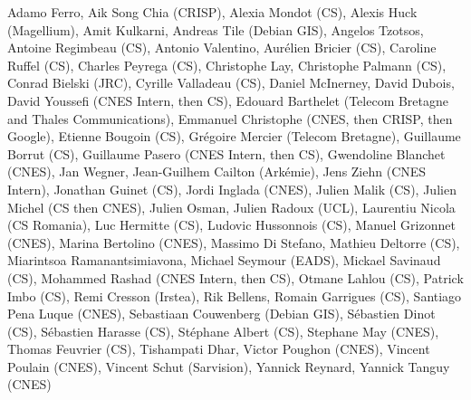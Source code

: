Adamo Ferro,
Aik Song Chia (CRISP),
Alexia Mondot (CS),
Alexis Huck (Magellium),
Amit Kulkarni,
Andreas Tile (Debian GIS),
Angelos Tzotsos,
Antoine Regimbeau (CS),
Antonio Valentino,
Aur\'elien Bricier (CS),
Caroline Ruffel (CS),
Charles Peyrega (CS),
Christophe Lay,
Christophe Palmann (CS),
Conrad Bielski (JRC),
Cyrille Valladeau (CS),
Daniel McInerney,
David Dubois,
David Youssefi  (CNES Intern, then CS),
Edouard Barthelet (Telecom Bretagne and Thales Communications),
Emmanuel Christophe (CNES, then CRISP, then Google),
Etienne Bougoin (CS),
Gr\'egoire Mercier (Telecom Bretagne),
Guillaume Borrut (CS),
Guillaume Pasero (CNES Intern, then CS),
Gwendoline Blanchet (CNES),
Jan Wegner,
Jean-Guilhem Cailton (Ark\'emie),
Jens Ziehn (CNES Intern),
Jonathan Guinet (CS),
Jordi Inglada (CNES),
Julien Malik (CS),
Julien Michel (CS then CNES),
Julien Osman,
Julien Radoux (UCL),
Laurentiu Nicola (CS Romania),
Luc Hermitte (CS),
Ludovic Hussonnois (CS),
Manuel Grizonnet (CNES),
Marina Bertolino (CNES),
Massimo Di Stefano,
Mathieu Deltorre (CS),
Miarintsoa Ramanantsimiavona,
Michael Seymour (EADS),
Mickael Savinaud (CS),
Mohammed Rashad (CNES Intern, then CS),
Otmane Lahlou (CS),
Patrick Imbo (CS),
Remi Cresson (Irstea),
Rik Bellens,
Romain Garrigues (CS),
Santiago Pena Luque (CNES),
Sebastiaan Couwenberg (Debian GIS),
S\'ebastien Dinot (CS),
S\'ebastien Harasse (CS),
St\'ephane Albert (CS),
Stephane May (CNES),
Thomas Feuvrier (CS),
Tishampati Dhar,
Victor Poughon (CNES),
Vincent Poulain (CNES),
Vincent Schut (Sarvision),
Yannick Reynard,
Yannick Tanguy (CNES)

